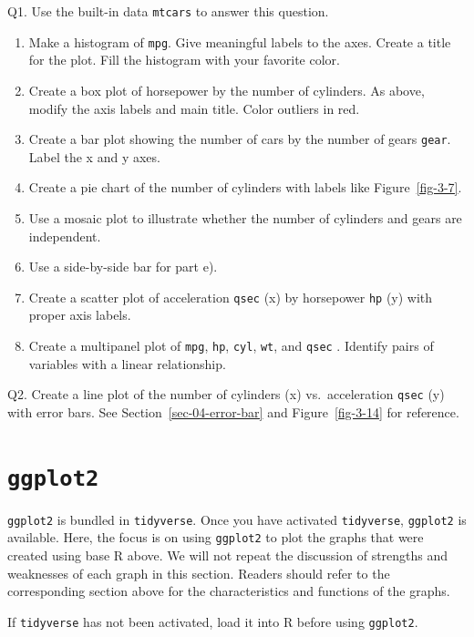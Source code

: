 \documentclass[
  letterpaper,
  DIV=11,
  numbers=noendperiod]{scrreprt}
\begin{document}
Q1. Use the built-in data \texttt{mtcars} to answer this question.

\begin{enumerate}
\def\labelenumi{\alph{enumi}.}
\item
  Make a histogram of \texttt{mpg}. Give meaningful labels to the axes.
  Create a title for the plot. Fill the histogram with your favorite
  color.
\item
  Create a box plot of horsepower by the number of cylinders. As above,
  modify the axis labels and main title. Color outliers in red.
\item
  Create a bar plot showing the number of cars by the number of gears
  \texttt{gear}. Label the x and y axes.
\item
  Create a pie chart of the number of cylinders with labels like
  Figure~\ref{fig-3-7}.
\item
  Use a mosaic plot to illustrate whether the number of cylinders and
  gears are independent.
\item
  Use a side-by-side bar for part e).
\item
  Create a scatter plot of acceleration \texttt{qsec} (x) by horsepower
  \texttt{hp} (y) with proper axis labels.
\item
  Create a multipanel plot of \texttt{mpg}, \texttt{hp}, \texttt{cyl},
  \texttt{wt}, and \texttt{qsec} . Identify pairs of variables with a
  linear relationship.
\end{enumerate}

Q2. Create a line plot of the number of cylinders (x) vs.~acceleration
\texttt{qsec} (y) with error bars. See Section~\ref{sec-04-error-bar}
and Figure~\ref{fig-3-14} for reference.

\section{\texorpdfstring{\texttt{ggplot2}}{ggplot2}}\label{ggplot2}

\texttt{ggplot2} is bundled in \texttt{tidyverse}. Once you have
activated \texttt{tidyverse}, \texttt{ggplot2} is available. Here, the
focus is on using \texttt{ggplot2} to plot the graphs that were created
using base R above. We will not repeat the discussion of strengths and
weaknesses of each graph in this section. Readers should refer to the
corresponding section above for the characteristics and functions of the
graphs.

If \texttt{tidyverse} has not been activated, load it into R before
using \texttt{ggplot2}.
\end{document}
